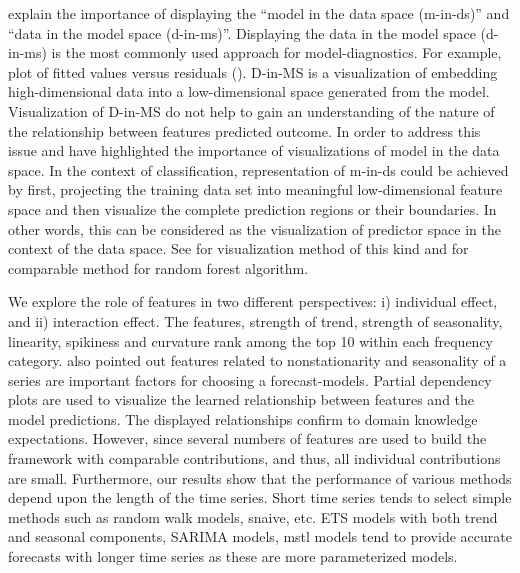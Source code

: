\documentclass[11pt,a4paper,]{article}
\begin{document}
\textcite{wickham2015visualizing} explain the importance of displaying
the ``model in the data space (m-in-ds)'' and ``data in the model space
(d-in-ms)''. Displaying the data in the model space (d-in-ms) is the
most commonly used approach for model-diagnostics. For example, plot of
fitted values versus residuals (\textcite{wickham2015visualizing}).
D-in-MS is a visualization of embedding high-dimensional data into a
low-dimensional space generated from the model. Visualization of D-in-MS
do not help to gain an understanding of the nature of the relationship
between features predicted outcome. In order to address this issue
\textcite{wickham2015visualizing} and \textcite{da2017interactive} have
highlighted the importance of visualizations of model in the data space.
In the context of classification, representation of m-in-ds could be
achieved by first, projecting the training data set into meaningful
low-dimensional feature space and then visualize the complete prediction
regions or their boundaries. In other words, this can be considered as
the visualization of predictor space in the context of the data space.
See \textcite{wickham2015visualizing} for visualization method of this
kind and \textcite{da2017interactive} for comparable method for random
forest algorithm.

We explore the role of features in two different perspectives: i)
individual effect, and ii) interaction effect. The features, strength of
trend, strength of seasonality, linearity, spikiness and curvature rank
among the top 10 within each frequency category.
\textcite{lemke2010meta} also pointed out features related to
nonstationarity and seasonality of a series are important factors for
choosing a forecast-models. Partial dependency plots are used to
visualize the learned relationship between features and the model
predictions. The displayed relationships confirm to domain knowledge
expectations. However, since several numbers of features are used to
build the framework with comparable contributions, and thus, all
individual contributions are small. Furthermore, our results show that
the performance of various methods depend upon the length of the time
series. Short time series tends to select simple methods such as random
walk models, snaive, etc. ETS models with both trend and seasonal
components, SARIMA models, mstl models tend to provide accurate
forecasts with longer time series as these are more parameterized
models.
\end{document}
